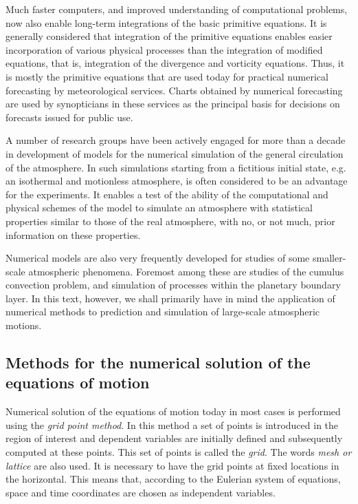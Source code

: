Much faster computers, and improved understanding of computational
problems, now also enable long-term integrations of the basic primitive
equations. It is generally considered that integration of the primitive
equations enables easier incorporation of various physical processes
than the integration of modified equations, that is, integration of the
divergence and vorticity equations. Thus, it is mostly the primitive
equations that are used today for practical numerical forecasting by
meteorological services. Charts obtained by numerical forecasting are
used by synopticians in these services as the principal basis for
decisions on forecasts issued for public use.

A number of research groups have been actively engaged for more than a
decade in development of models for the numerical simulation of the
general circulation of the atmosphere. In such simulations starting from
a fictitious initial state, e.g. an isothermal and motionless
atmosphere, is often considered to be an advantage for the experiments.
It enables a test of the ability of the computational and physical
schemes of the model to simulate an atmosphere with statistical
properties similar to those of the real atmosphere, with no, or not
much, prior information on these properties.

Numerical models are also very frequently developed for studies of some
smaller-scale atmospheric phenomena. Foremost among these are studies of
the cumulus convection problem, and simulation of processes within the
planetary boundary layer. In this text, however, we shall primarily have
in mind the application of numerical methods to prediction and
simulation of large-scale atmospheric motions.

\subsection{\texorpdfstring{\textbf{Methods for the numerical solution
of the equations of
motion}}{Methods for the numerical solution of the equations of motion}}\label{methods-for-the-numerical-solution-of-the-equations-of-motion}

Numerical solution of the equations of motion today in most cases is
performed using the \emph{grid point method}. In this method a set of
points is introduced in the region of interest and dependent variables
are initially defined and subsequently computed at these points. This
set of points is called the \emph{grid}. The words \emph{mesh or
lattice} are also used. It is necessary to have the grid points at fixed
locations in the horizontal. This means that, according to the Eulerian
system of equations, space and time coordinates are chosen as
independent variables.

